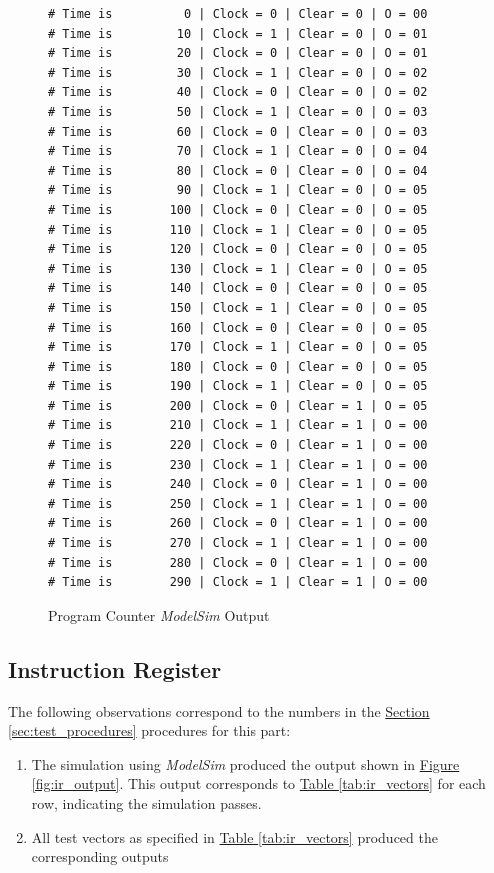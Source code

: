 \begin{figure}[htbp]
    \begin{lstlisting}[numbers=none, basicstyle = \ttfamily\scriptsize]
# Time is          0 | Clock = 0 | Clear = 0 | O = 00
# Time is         10 | Clock = 1 | Clear = 0 | O = 01
# Time is         20 | Clock = 0 | Clear = 0 | O = 01
# Time is         30 | Clock = 1 | Clear = 0 | O = 02
# Time is         40 | Clock = 0 | Clear = 0 | O = 02
# Time is         50 | Clock = 1 | Clear = 0 | O = 03
# Time is         60 | Clock = 0 | Clear = 0 | O = 03
# Time is         70 | Clock = 1 | Clear = 0 | O = 04
# Time is         80 | Clock = 0 | Clear = 0 | O = 04
# Time is         90 | Clock = 1 | Clear = 0 | O = 05
# Time is        100 | Clock = 0 | Clear = 0 | O = 05
# Time is        110 | Clock = 1 | Clear = 0 | O = 05
# Time is        120 | Clock = 0 | Clear = 0 | O = 05
# Time is        130 | Clock = 1 | Clear = 0 | O = 05
# Time is        140 | Clock = 0 | Clear = 0 | O = 05
# Time is        150 | Clock = 1 | Clear = 0 | O = 05
# Time is        160 | Clock = 0 | Clear = 0 | O = 05
# Time is        170 | Clock = 1 | Clear = 0 | O = 05
# Time is        180 | Clock = 0 | Clear = 0 | O = 05
# Time is        190 | Clock = 1 | Clear = 0 | O = 05
# Time is        200 | Clock = 0 | Clear = 1 | O = 05
# Time is        210 | Clock = 1 | Clear = 1 | O = 00
# Time is        220 | Clock = 0 | Clear = 1 | O = 00
# Time is        230 | Clock = 1 | Clear = 1 | O = 00
# Time is        240 | Clock = 0 | Clear = 1 | O = 00
# Time is        250 | Clock = 1 | Clear = 1 | O = 00
# Time is        260 | Clock = 0 | Clear = 1 | O = 00
# Time is        270 | Clock = 1 | Clear = 1 | O = 00
# Time is        280 | Clock = 0 | Clear = 1 | O = 00
# Time is        290 | Clock = 1 | Clear = 1 | O = 00
    \end{lstlisting}
    \caption{Program Counter \emph{ModelSim} Output\label{fig:pc_output}}
\end{figure}


\subsection{Instruction Register} %
\label{sub:instruction_register}

The following observations correspond to the numbers in the \hyperref[sec:test_procedures]{Section \ref*{sec:test_procedures}} procedures for this part:

\begin{enumerate}
    \item The simulation using \emph{ModelSim} produced the output shown in \hyperref[fig:ir_output]{Figure \ref*{fig:ir_output}}.
    This output corresponds to \hyperref[tab:ir_vectors]{Table \ref*{tab:ir_vectors}} for each row, indicating the simulation passes.
    \item All test vectors as specified in \hyperref[tab:ir_vectors]{Table \ref*{tab:ir_vectors}} produced the corresponding outputs
\end{enumerate}

